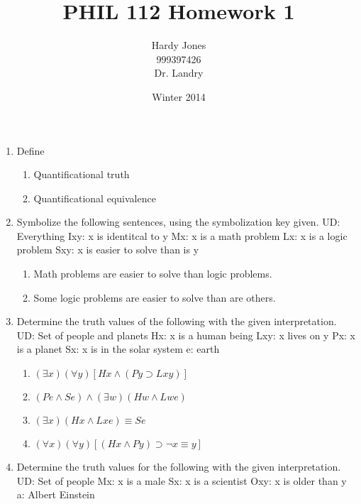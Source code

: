 \documentclass[12pt,letterpaper]{article}
\title{PHIL 112 Homework 1\vspace{-2ex}}
\author{Hardy Jones\\
        999397426\\
        Dr. Landry\vspace{-2ex}}
\date{Winter 2014}
\begin{document}
  \maketitle

  \begin{enumerate}
    \item Define
      \begin{enumerate}
        \item Quantificational truth
        \item Quantificational equivalence
      \end{enumerate}
    \item Symbolize the following sentences, using the symbolization key given.
      UD: Everything
      Ixy: x is identitcal to y
      Mx: x is a math problem
      Lx: x is a logic problem
      Sxy: x is easier to solve than is y
      \begin{enumerate}
        \item Math problems are easier to solve than logic problems.
        \item Some logic problems are easier to solve than are others.
      \end{enumerate}
    \item Determine the truth values of the following with the given interpretation.
      UD: Set of people and planets
      Hx: x is a human being
      Lxy: x lives on y
      Px: x is a planet
      Sx: x is in the solar system
      e: earth

      \begin{enumerate}
        \item $(\exists x)(\forall y)[Hx \land (Py \supset Lxy)]$
        \item $(Pe \land Se) \land (\exists w)(Hw \land Lwe)$
        \item $(\exists x)(Hx \land Lxe) \equiv Se$
        \item $(\forall x)(\forall y)[(Hx \land Py) \supset \neg x \equiv y]$
      \end{enumerate}
    \item Determine the truth values for the following with the given interpretation.
      UD: Set of people
      Mx: x is a male
      Sx: x is a scientist
      Oxy: x is older than y
      a: Albert Einstein


\end{enumerate}
\end{document}
